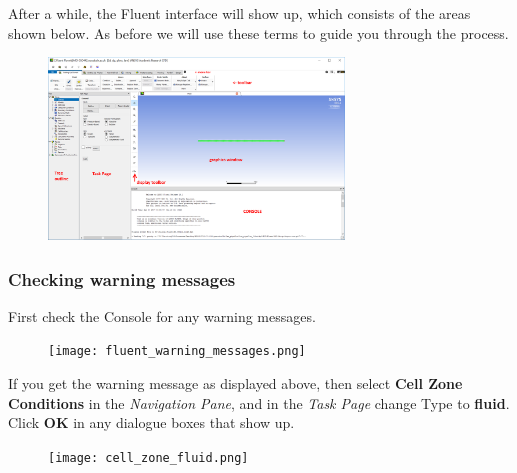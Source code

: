 \documentclass[11pt,a4paper,oneside]{scrartcl}
\newcommand\bfr[1]{\textcolor[rgb]{1,0.00,0.00}{\textbf{\textsf{#1}}}}
\begin{document}
After a while, the Fluent interface will show up, which consists of the areas shown below. As before we will use these terms to guide you through the process.
\begin{figure}[H]
\begin{center}
\includegraphics[width=0.7\textwidth,clip]{Fluent_GUI.png}
\end{center}
\end{figure}

\subsubsection{Checking warning messages}

First check the Console for any warning messages.
\begin{figure}[H]
\begin{center}
\texttt{[image: fluent\_warning\_messages.png]}
\end{center}
\end{figure}
If you get the warning message as displayed above, then select \bfr{Cell Zone Conditions} in the \emph{Navigation Pane}, and in the \emph{Task Page} change Type to \bfr{fluid}. Click \bfr{OK} in any dialogue boxes that show up.
\begin{figure}[H]
\begin{center}
\texttt{[image: cell\_zone\_fluid.png]}
\end{center}
\end{figure}
\end{document}
